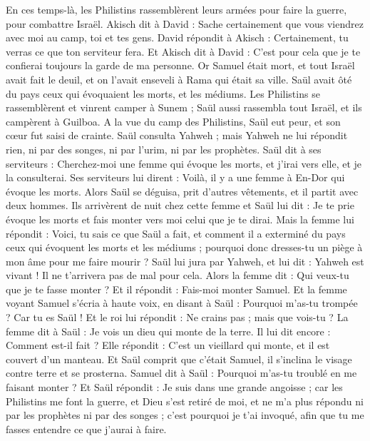 \begin{multicols}{2}
\VerseOne{}En ces temps-là, les Philistins rassemblèrent leurs armées pour faire la guerre, pour combattre Israël. Akisch dit à David : Sache certainement que vous viendrez avec moi au camp, toi et tes gens.
David répondit à Akisch : Certainement, tu verras ce que ton serviteur fera. Et Akisch dit à David : C'est pour cela que je te confierai toujours la garde de ma personne.
Or Samuel était mort, et tout Israël avait fait le deuil, et on l'avait enseveli à Rama qui était sa ville. Saül avait ôté du pays ceux qui évoquaient les morts, et les médiums.
Les Philistins se rassemblèrent et vinrent camper à Sunem ; Saül aussi rassembla tout Israël, et ils campèrent à Guilboa.
A la vue du camp des Philistins, Saül eut peur, et son cœur fut saisi de crainte.
Saül consulta Yahweh ; mais Yahweh ne lui répondit rien, ni par des songes, ni par l'urim, ni par les prophètes.
Saül dit à ses serviteurs : Cherchez-moi une femme qui évoque les morts, et j'irai vers elle, et je la consulterai. Ses serviteurs lui dirent : Voilà, il y a une femme à En-Dor qui évoque les morts.
Alors Saül se déguisa, prit d'autres vêtements, et il partit avec deux hommes. Ils arrivèrent de nuit chez cette femme et Saül lui dit : Je te prie évoque les morts et fais monter vers moi celui que je te dirai.
Mais la femme lui répondit : Voici, tu sais ce que Saül a fait, et comment il a exterminé du pays ceux qui évoquent les morts et les médiums ; pourquoi donc dresses-tu un piège à mon âme pour me faire mourir ?
Saül lui jura par Yahweh, et lui dit : Yahweh est vivant ! Il ne t’arrivera pas de mal pour cela.
Alors la femme dit : Qui veux-tu que je te fasse monter ? Et il répondit : Fais-moi monter Samuel.
Et la femme voyant Samuel s'écria à haute voix, en disant à Saül : Pourquoi m'as-tu trompée ? Car tu es Saül !
Et le roi lui répondit : Ne crains pas ; mais que vois-tu ? La femme dit à Saül : Je vois un dieu qui monte de la terre.
Il lui dit encore : Comment est-il fait ? Elle répondit : C'est un vieillard qui monte, et il est couvert d'un manteau. Et Saül comprit que c'était Samuel, il s’inclina le visage contre terre et se prosterna.
Samuel dit à Saül : Pourquoi m'as-tu troublé en me faisant monter ? Et Saül répondit : Je suis dans une grande angoisse ; car les Philistins me font la guerre, et Dieu s'est retiré de moi, et ne m'a plus répondu ni par les prophètes ni par des songes ; c'est pourquoi je t'ai invoqué, afin que tu me fasses entendre ce que j'aurai à faire.

\end{multicols}
